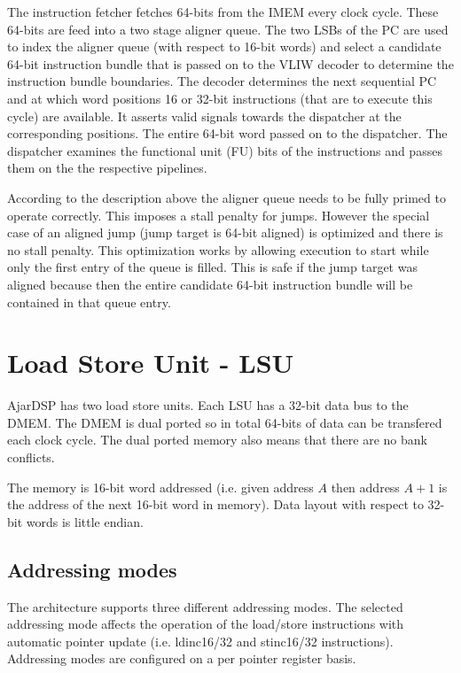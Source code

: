 \documentclass[11pt]{book}
\begin{document}
The instruction fetcher fetches 64-bits from the IMEM every clock
cycle. These 64-bits are feed into a two stage aligner queue. The two
LSBs of the PC are used to index the aligner queue (with respect to
16-bit words) and select a candidate 64-bit instruction bundle that is
passed on to the VLIW decoder to determine the instruction bundle
boundaries. The decoder determines the next sequential PC and at which
word positions 16 or 32-bit instructions (that are to execute this
cycle) are available. It asserts valid signals towards the dispatcher
at the corresponding positions. The entire 64-bit word passed on to
the dispatcher. The dispatcher examines the functional unit (FU) bits
of the instructions and passes them on the the respective pipelines.

According to the description above the aligner queue needs to be fully
primed to operate correctly. This imposes a stall penalty for
jumps. However the special case of an aligned jump (jump target is
64-bit aligned) is optimized and there is no stall penalty. This
optimization works by allowing execution to start while only the first
entry of the queue is filled. This is safe if the jump target was
aligned because then the entire candidate 64-bit instruction bundle
will be contained in that queue entry.

\section{Load Store Unit - LSU}
AjarDSP has two load store units. Each LSU has a 32-bit data bus to
the DMEM. The DMEM is dual ported so in total 64-bits of data can be
transfered each clock cycle. The dual ported memory also means that
there are no bank conflicts.

The memory is 16-bit word addressed (i.e. given address $A$ then
address $A+1$ is the address of the next 16-bit word in memory). Data
layout with respect to 32-bit words is little endian.

\subsection{Addressing modes}
The architecture supports three different addressing modes. The
selected addressing mode affects the operation of the load/store
instructions with automatic pointer update (i.e. ldinc16/32 and
stinc16/32 instructions). Addressing modes are configured on a per
pointer register basis.
\end{document}
